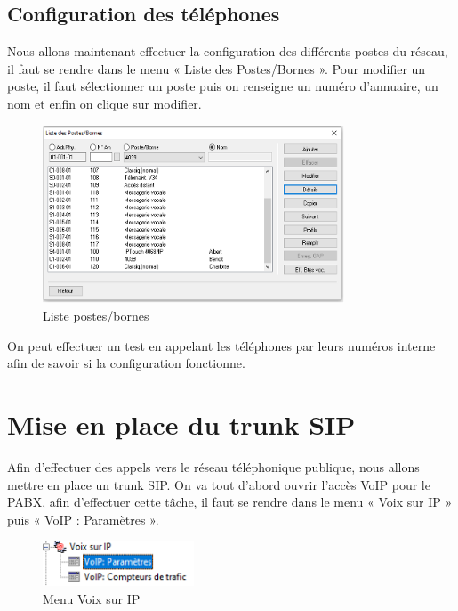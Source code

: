 \documentclass[12pt, a4paper]{article}
\begin{document}
	\newpage
	\subsection{Configuration des téléphones}

	Nous allons maintenant effectuer la configuration des différents postes du réseau, 
	il faut se rendre dans le menu « Liste des Postes/Bornes ». Pour modifier un poste, 
	il faut sélectionner un poste puis on renseigne un numéro d’annuaire, un nom et enfin 
	on clique sur modifier.

	\begin{figure}[H]
		\centering
		\includegraphics[width=0.8\textwidth]{img/liste.png}
		\caption{Liste postes/bornes}
		\label{fig:liste}
	\end{figure}

	On peut effectuer un test en appelant les téléphones par leurs numéros interne 
	afin de savoir si la configuration fonctionne.

\section{Mise en place du trunk SIP}

Afin d’effectuer des appels vers le réseau téléphonique publique, nous allons
mettre en place un trunk SIP. On va tout d’abord ouvrir l’accès VoIP pour le PABX,
afin d’effectuer cette tâche, il faut se rendre dans le menu « Voix sur IP » puis « VoIP :
Paramètres ».

\begin{figure}[H]
	\centering
	\includegraphics[width=0.4\textwidth]{img/menuv.png}
	\caption{Menu Voix sur IP}
	\label{fig:menuv}
\end{figure}
\newpage
\end{document}
